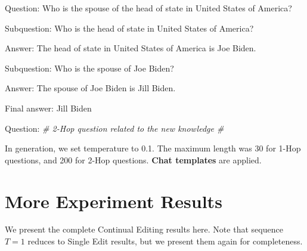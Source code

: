 \begin{itemize}
{{    Question: Who is the spouse of the head of state in United States of America?
    
    Subquestion: Who is the head of state in United States of America?
    
    Answer: The head of state in United States of America is Joe Biden.
    
    Subquestion: Who is the spouse of Joe Biden?
    
    Answer: The spouse of Joe Biden is Jill Biden.
    
    Final answer: Jill Biden
    
    Question: \textit{ \# 2-Hop question related to the new knowledge \#}

    }%
}
\end{itemize}

In generation, we set temperature to 0.1. The maximum length was 30 for 1-Hop questions, and 200 for 2-Hop questions. 
\textbf{Chat templates} are applied. 

\section{More Experiment Results}
\label{app:results}


We present the complete Continual Editing results here. 
Note that sequence $T=1$ reduces to Single Edit results, but we present them again for completeness. 





